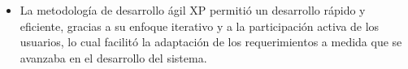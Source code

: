 \begin{itemize}
      \item La metodología de desarrollo ágil XP permitió un desarrollo rápido y eficiente, gracias a su enfoque iterativo
            y a la participación activa de los usuarios, lo cual facilitó la adaptación de los requerimientos a medida que se
            avanzaba en el desarrollo del sistema.

\end{itemize}